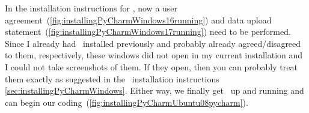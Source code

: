 %
In the installation instructions for \microsoftWindows, now a user agreement~(\cref{fig:installingPyCharmWindows16running}) and data upload statement~(\cref{fig:installingPyCharmWindows17running}) need to be performed.
Since I already had \pycharm\ installed previously and probably already agreed/disagreed to them, respectively, these windows did not open in my current installation and I could not take screenshots of them.
If they open, then you can probably treat them exactly as suggested in the \microsoftWindows\ installation instructions \cref{sec:installingPyCharmWindows}.
Either way, we finally get \pycharm\ up and running and can begin our coding~(\cref{fig:installingPyCharmUbuntu08pycharm}).
%
\FloatBarrier%
\endhsection%
%
